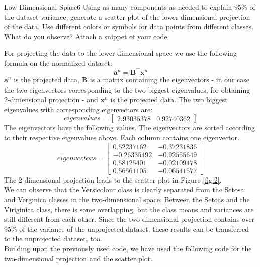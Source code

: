 \begin{questions}
\begin{question}{Low Dimensional Space}{6}
Using as many components as needed to explain $95\%$ of the dataset variance, generate a scatter plot of the lower-dimensional projection of the data. Use different colors or symbols for data points from different classes. 
What do you observe? Attach a snippet of your code.
\begin{answer}
For projecting the data to the lower dimensional space we use the following formula on the normalized dataset:
\begin{equation}
\mathbf{a}^{n}=\mathbf{B}^{\top}\mathbf{x}^{n}
\end{equation}
$\mathbf{a}^{n}$ is the projected data, $\mathbf{B}$ is a matrix containing the eigenvectors - in our case the two eigenvectors corresponding to the two biggest eigenvalues, for obtaining 2-dimensional projection - and $\mathbf{x}^{n}$ is the projected data. The two biggest eigenvalues with corresponding eigenvectors are:
$$eigenvalues =\begin{bmatrix} 
2.93035378 & 0.92740362
\end{bmatrix}$$
The eigenvectors have the following values. The eigenvectors are sorted according to their respective eigenvalues above. Each column contains one eigenvector.
$$eigenvectors = \begin{bmatrix} 
 0.52237162 &-0.37231836 \\
 -0.26335492 &-0.92555649 \\
 0.58125401 &-0.02109478\\
 0.56561105& -0.06541577 
\end{bmatrix}$$
The 2-dimensional projection leads to the scatter plot in Figure \ref{fig:2}. \\
We can observe that the Versicolour class is clearly separated from the Setosa and Verginica classes in the two-dimensional space. Between the Setoas and the Viriginica class, there is some overlapping, but the class means and variances are still different from each other. Since the two-dimensional projection contains over 95\% of the variance of the unprojected dataset, these results can be transferred to the unprojected dataset, too.\\
Building upon the previously used code, we have used the following code for the two-dimensional projection and the scatter plot.\\

\end{answer}
\begin{figure}[h!]

\end{figure}
\end{question}
\end{questions}

